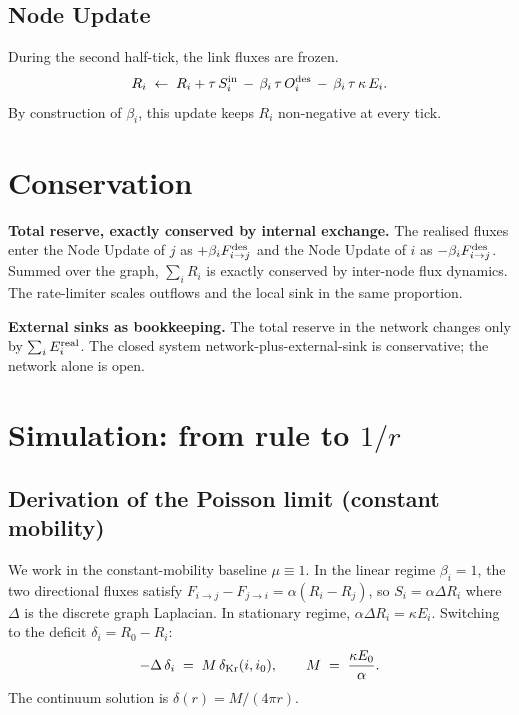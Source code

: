 \documentclass[11pt,a4paper]{article}
\begin{document}
\subsection{Node Update}

During the second half-tick, the link fluxes are frozen.
\begin{equation}
R_i \;\leftarrow\; R_i + \tau\, S_i^{\rm in}
\,-\, \beta_i\, \tau\, O_i^{\rm des}
\,-\, \beta_i\, \tau\, \kappa\, E_i.
\label{eq:nodeR}
\end{equation}
By construction of $\beta_i$, this update keeps $R_i$
non-negative at every tick.

\section{Conservation}
\label{sec:conservation}

\textbf{Total reserve, exactly conserved by internal exchange.}
The realised fluxes enter the Node Update of $j$ as
$+\beta_i F_{i \to j}^{\rm des}$ and the Node Update of $i$ as
$-\beta_i F_{i \to j}^{\rm des}$. Summed over the graph,
$\sum_i R_i$ is exactly conserved by inter-node flux dynamics.
The rate-limiter scales outflows and the local sink in the
same proportion.

\textbf{External sinks as bookkeeping.} The total reserve in
the network changes only by $\sum_i E_i^{\rm real}$. The
closed system network-plus-external-sink is conservative; the
network alone is open.

\section{Simulation: from rule to $1/r$}
\label{sec:sim}

\subsection{Derivation of the Poisson limit (constant mobility)}

We work in the constant-mobility baseline $\mu \equiv 1$. In
the linear regime $\beta_i = 1$, the two directional fluxes
satisfy $F_{i \to j} - F_{j \to i} = \alpha (R_i - R_j)$, so
$S_i = \alpha \Delta R_i$ where $\Delta$ is the discrete graph
Laplacian. In stationary regime,
$\alpha \Delta R_i = \kappa E_i$. Switching to the deficit
$\delta_i = R_0 - R_i$:
\begin{equation}
-\Delta\, \delta_i \;=\; M\, \delta_{\rm Kr}(i, i_0),
\qquad M \;=\; \frac{\kappa E_0}{\alpha}.
\label{eq:poisson}
\end{equation}
The continuum solution is $\delta(r) = M/(4\pi r)$.
\end{document}
